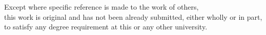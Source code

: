\begin{titlepage}
\begin{center}
		
\vspace*{1.2cm}

Except where specific reference is made to the work of others,\\ this work is original and has not been already submitted, either wholly or in part,\\ to satisfy any degree requirement at this or any other university.
        
       
        
    \end{center}
\end{titlepage}